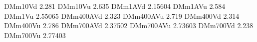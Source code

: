 DMm10Vd 2.281
DMm10Vu 2.635
DMm1AVd 2.15604
DMm1AVu 2.584
DMm1Vu 2.55065
DMm400AVd 2.323
DMm400AVu 2.719
DMm400Vd 2.314
DMm400Vu 2.786
DMm700AVd 2.37502
DMm700AVu 2.73603
DMm700Vd 2.238
DMm700Vu 2.77403
